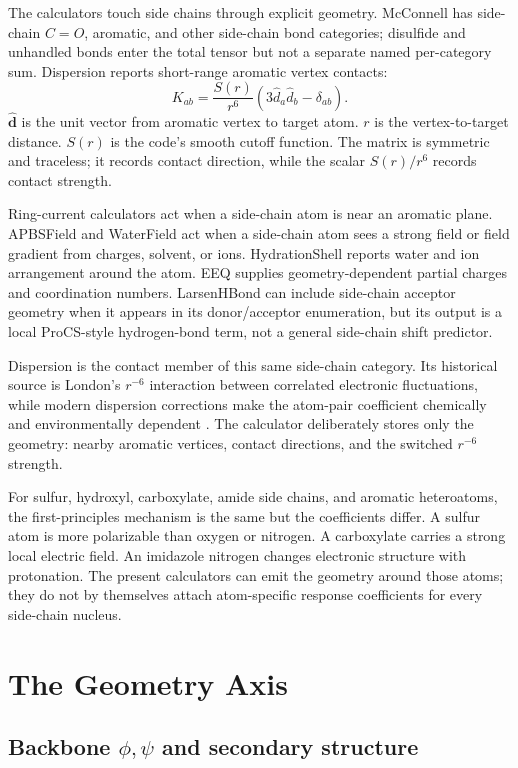 \documentclass[11pt]{article}
\begin{document}
The calculators touch side chains through explicit geometry. McConnell has
side-chain \(C=O\), aromatic, and other side-chain bond categories; disulfide
and unhandled bonds enter the total tensor but not a separate named per-category sum.
Dispersion reports short-range aromatic vertex contacts:
\[
  K_{ab}
  =
  \frac{S(r)}{r^6}\left(3\hat d_a\hat d_b-\delta_{ab}\right).
\]
\(\hat{\bm d}\) is the unit vector from aromatic vertex to target atom.
\(r\) is the vertex-to-target distance. \(S(r)\) is the code's smooth cutoff
function. The matrix is symmetric and traceless; it records contact direction,
while the scalar \(S(r)/r^6\) records contact strength.

Ring-current calculators act when a side-chain atom is near an aromatic plane.
APBSField and WaterField act when a side-chain atom sees a strong field or
field gradient from charges, solvent, or ions. HydrationShell reports water and
ion arrangement around the atom. EEQ supplies geometry-dependent partial
charges and coordination numbers. LarsenHBond can include side-chain acceptor
geometry when it appears in its donor/acceptor enumeration, but its output is a
local ProCS-style hydrogen-bond term, not a general side-chain shift predictor.

Dispersion is the contact member of this same side-chain category. Its
historical source is London's \(r^{-6}\) interaction between correlated
electronic fluctuations, while modern dispersion corrections make the
atom-pair coefficient chemically and environmentally dependent
\cite{london1937,grimme2010,wagner2015}. The calculator deliberately stores
only the geometry: nearby aromatic vertices, contact directions, and the
switched \(r^{-6}\) strength.

For sulfur, hydroxyl, carboxylate, amide side chains, and aromatic heteroatoms,
the first-principles mechanism is the same but the coefficients differ. A
sulfur atom is more polarizable than oxygen or nitrogen. A carboxylate carries
a strong local electric field. An imidazole nitrogen changes electronic
structure with protonation. The present calculators can emit the geometry
around those atoms; they do not by themselves attach atom-specific response
coefficients for every side-chain nucleus.

\section{The Geometry Axis}

\subsection{\texorpdfstring{Backbone \(\phi,\psi\) and secondary structure}
{Backbone phi/psi and secondary structure}}
\end{document}
